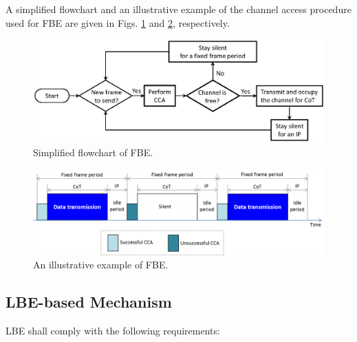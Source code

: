 A simplified flowchart and an illustrative example of the channel access procedure used for FBE are given in Figs. \ref{figs:FBE-flowchart} and \ref{figs:FBE-example}, respectively.
\begin{figure}[!ht]
	\centering
	\includegraphics[width=0.9\columnwidth]{figs/FBE-flowchart}
	\caption{Simplified flowchart of FBE.}
	\label{figs:FBE-flowchart}
\end{figure}
\begin{figure}[!ht]
	\centering
	\includegraphics[width=0.9\columnwidth]{figs/FBE-example}
	\caption{An illustrative example of FBE.}
	\label{figs:FBE-example}
\end{figure}

\subsection{LBE-based Mechanism}
\label{etsi-lbt:lbe}

LBE shall comply with the following requirements:

